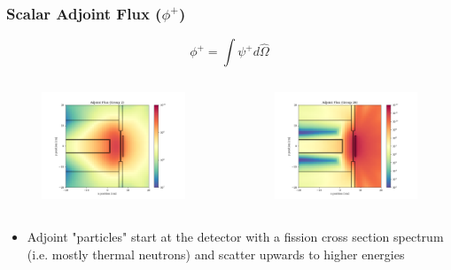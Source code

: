 \documentclass[t]{beamer}
\begin{document}
\begin{frame}
  \frametitle{Scalar Adjoint Flux ($\phi^+$)}
  \vskip-0.25in
  \begin{equation}
    \phi^+ = \int\psi^+d\hat{\Omega}
  \end{equation}
  \vskip-0.25in
  \begin{columns}
    \begin{figure}
      \includegraphics[trim={0.7in 0.15in 1.05in 0.4in},clip,scale=0.36]{images/scalar_flux_adj_g02.png}
    \end{figure}
    \begin{figure}
      \includegraphics[trim={0.7in 0.15in 1.05in 0.4in},clip,scale=0.36]{images/scalar_flux_adj_g26.png}
    \end{figure}
  \end{columns}
  \begin{itemize}
    \item Adjoint "particles" start at the detector with a fission cross section
          spectrum (i.e. mostly thermal neutrons) and scatter upwards to higher energies
  \end{itemize}
\end{frame}
\end{document}
